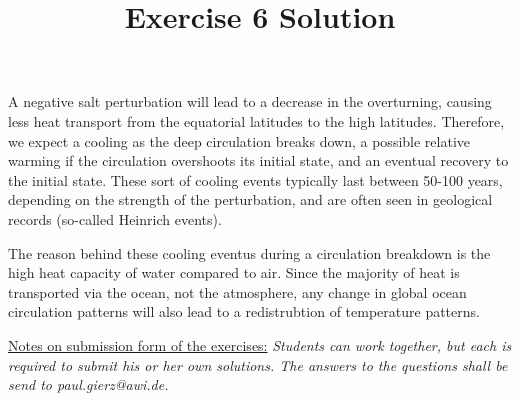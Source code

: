 \documentclass[a4paper,12pt]{article}
\title{Exercise 6 Solution}
\begin{document}
\maketitle
\thispagestyle{fancy}

A negative salt perturbation will lead to a decrease in the
overturning, causing less heat transport from the equatorial latitudes
to the high latitudes. Therefore, we expect a cooling as the deep
circulation breaks down, a possible relative warming if the
circulation overshoots its initial state, and an eventual recovery to
the initial state. These sort of cooling events typically last between
50-100 years, depending on the strength of the perturbation, and are
often seen in geological records (so-called Heinrich events).

The reason behind these cooling eventus during a circulation breakdown
is the high heat capacity of water compared to air. Since the majority
of heat is transported via the ocean, not the atmosphere, any change
in global ocean circulation patterns will also lead to a redistrubtion
of temperature patterns. 


\vfill
\underline{Notes on submission form of the exercises:}
 \textit{Students can work together, but each is required to submit
   his or her own solutions. The answers to the questions shall be send to paul.gierz@awi.de.}
\end{document}
